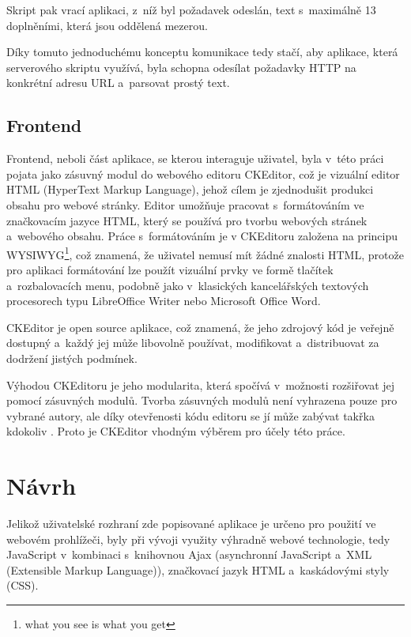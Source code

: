 \documentclass[a4paper,11pt,openany]{book} %
\begin{document}
Skript pak vrací aplikaci, z~níž byl požadavek odeslán, text s~maximálně 13 doplněními, která jsou oddělená mezerou.

Díky tomuto jednoduchému konceptu komunikace tedy stačí, aby aplikace, která serverového skriptu využívá, byla schopna odesílat požadavky HTTP na konkrétní adresu URL a~parsovat prostý text. 

\section{Frontend}

Frontend, neboli část aplikace, se kterou interaguje uživatel, byla v~této práci pojata jako zásuvný modul do webového editoru CKEditor, což je vizuální editor HTML (HyperText Markup Language), jehož cílem je zjednodušit produkci obsahu pro webové stránky. Editor umožňuje pracovat s~formátováním ve značkovacím jazyce HTML, který se používá pro tvorbu webových stránek a~webového obsahu. Práce s~formátováním je v CKEditoru založena na principu WYSIWYG\footnote{what you see is what you get}, což znamená, že uživatel nemusí mít žádné znalosti HTML, protože pro aplikaci formátování lze použít vizuální prvky ve formě tlačítek a~rozbalovacích menu, podobně jako v~klasických kancelářských textových procesorech typu LibreOffice Writer nebo Microsoft Office Word.

CKEditor je open source aplikace, což znamená, že jeho zdrojový kód je veřejně dostupný a~každý jej může libovolně používat, modifikovat a~distribuovat za dodržení jistých podmínek. 

Výhodou CKEditoru je jeho modularita, která spočívá v~možnosti rozšiřovat jej pomocí zásuvných modulů. Tvorba zásuvných modulů není vyhrazena pouze pro vybrané autory, ale  díky otevřenosti kódu editoru se jí může zabývat takřka kdokoliv \parencite{cksource2015}. Proto je CKEditor vhodným výběrem pro účely této práce. %

\chapter{Návrh}\label{navrh}

Jelikož uživatelské rozhraní zde popisované aplikace je určeno pro použití ve webovém prohlížeči, byly při vývoji využity výhradně webové technologie, tedy JavaScript v~kombinaci s~knihovnou Ajax (asynchronní JavaScript a~XML (Extensible Markup Language)), značkovací jazyk HTML a~kaskádovými styly (CSS). 
\end{document}
